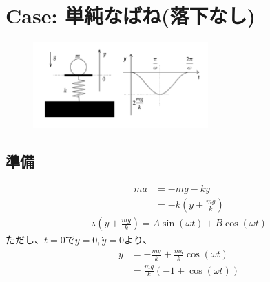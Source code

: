 \documentclass[a4paper,11pt]{jsarticle}
\begin{document}

\clearpage
\section{Case: 単純なばね(落下なし)}
\label{section:simple_spring_nonh}

\begin{figure}[h]
  \centering
  \includegraphics[width = 0.6\textwidth]{simple_string.png}
  \caption{}
  \label{simple_string.png}
\end{figure}

\subsection{準備}
\begin{align}
  ma & = -mg - ky
  \\ &= -k\left(y + \frac{mg}{k}\right)
\end{align}
\begin{align}
  \therefore
  \left(y+\frac{mg}{k}\right) = A\sin(\omega t) + B\cos(\omega t)
\end{align}
ただし、$t=0$で$y=0,\dot{y}=0$より、
\begin{align}
  y & = -\frac{mg}{k} + \frac{mg}{k}\cos(\omega t)
  \\ &= \frac{mg}{k}\left(-1+\cos(\omega t)\right)
\end{align}
\end{document}
